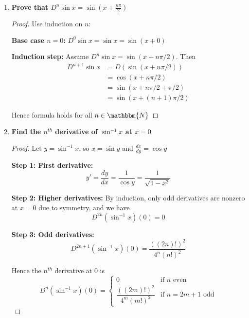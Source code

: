 \documentclass[14pt]{extarticle}
\begin{document}
\begin{enumerate}
\begin{proof}
Reindex sums and use $\binom{n}{k} + \binom{n}{k-1} = \binom{n+1}{k}$ to obtain
\[
D^{n+1} (fg) = \sum_{k=0}^{n+1} \binom{n+1}{k} D^k f \cdot D^{n+1-k} g
\]

\medskip
Hence the formula holds for all $n \in \mathbbm{N}$
\end{proof}

\newpage
\item \textbf{Prove that $D^n \sin x = \sin(x + \frac{n\pi}{2})$}

\begin{proof}
Use induction on $n$:

\medskip
\textbf{Base case $n=0$:} $D^0 \sin x = \sin x = \sin(x + 0)$

\textbf{Induction step:} Assume $D^n \sin x = \sin(x + n\pi/2)$. Then
\begin{align*}
D^{n+1} \sin x &= D(\sin(x+n\pi/2)) \\ &= \cos(x+n\pi/2) \\ &= \sin(x + n\pi/2 + \pi/2) \\ &= \sin(x + (n+1)\pi/2)
\end{align*}

Hence formula holds for all $n \in \mathbbm{N}$
\end{proof}

\newpage
\item \textbf{Find the $n^{th}$ derivative of $\sin^{-1} x$ at $x=0$}

\begin{proof}
Let $y = \sin^{-1} x$, so $x = \sin y$ and $\frac{dx}{dy} = \cos y$

\medskip
\textbf{Step 1: First derivative:} 
\[
y' = \frac{dy}{dx} = \frac{1}{\cos y} = \frac{1}{\sqrt{1-x^2}}
\]

\textbf{Step 2: Higher derivatives:} By induction, only odd derivatives are nonzero at $x=0$ due to symmetry, and we have
\[
D^{2n} (\sin^{-1} x)(0) = 0
\]

\textbf{Step 3: Odd derivatives:} 
\[
D^{2n+1} (\sin^{-1} x)(0) = \frac{((2n)!)^2}{4^n(n!)^2}
\]

Hence the $n^{th}$ derivative at $0$ is
\[
D^n (\sin^{-1} x)(0) = \begin{cases}
0 & \text{if $n$ even} \\
\dfrac{((2m)!)^2}{4^m (m!)^2} & \text{if $n=2m+1$ odd}
\end{cases}
\]
\end{proof}


\end{enumerate}
\end{document}
